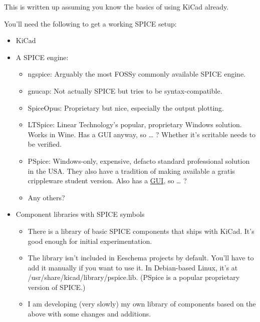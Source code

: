 

This is written up assuming you know the basics of using KiCad already.

\secdown


You'll need the following to get a working SPICE setup:

\begin{itemize}
\item KiCad
\item A SPICE engine:
\begin{itemize}
\item ngspice: Arguably the most FOSSy commonly available SPICE engine.
\item gnucap: Not actually SPICE but tries to be syntax-compatible.
\item SpiceOpus: Proprietary but nice, especially the output plotting.
 
\item LTSpice: Linear Technology's popular, proprietary Windows solution. Works
in Wine. Has a GUI anyway, so … ? Whether it's scritable needs to be verified.

\item PSpice: Windows-only, expensive, defacto standard professional solution in
the USA. They also have a tradition of making available a gratis crippleware
student version. Also has a \underline{GUI}, so … ?
\item Any others?
\end{itemize}
\item Component libraries with SPICE symbols
\begin{itemize}
  
\item There is a library of basic SPICE components that ships with KiCad. It's
good enough for initial experimentation.

\item The library isn't included in Eeschema projects by default. You'll have to
add it manually if you want to use it.
In Debian-based Linux, it's at /usr/share/kicad/library/pspice.lib. (PSpice is a
popular proprietary version of SPICE.)

\item I am developing (very slowly) my own library of components based on the
above with some changes and additions.
 
\end{itemize} 

\end{itemize}

